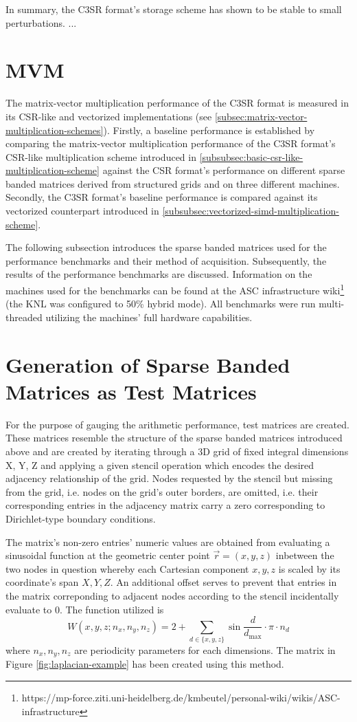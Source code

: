     In summary, the C3SR format's storage scheme has shown to be stable to small perturbations. ...

  \section{MVM}

  The matrix-vector multiplication performance of the C3SR format is measured in its CSR-like and vectorized implementations (see \ref{subsec:matrix-vector-multiplication-schemes}). Firstly, a baseline performance is established by comparing the matrix-vector multiplication performance of the C3SR format's CSR-like multiplication scheme introduced in \ref{subsubsec:basic-csr-like-multiplication-scheme} against the CSR format's performance on different sparse banded matrices derived from structured grids and on three different machines. Secondly, the C3SR format's baseline performance is compared against its vectorized counterpart introduced in \ref{subsubsec:vectorized-simd-multiplication-scheme}.

  The following subsection introduces the sparse banded matrices used for the performance benchmarks and their method of acquisition. Subsequently, the results of the performance benchmarks are discussed. Information on the machines used for the benchmarks can be found at the ASC infrastructure wiki\footnote{https://mp-force.ziti.uni-heidelberg.de/kmbeutel/personal-wiki/wikis/ASC-infrastructure} (the KNL was configured to 50\% hybrid mode). All benchmarks were run multi-threaded utilizing the machines' full hardware capabilities.

  \section{Generation of Sparse Banded Matrices as Test Matrices}

    For the purpose of gauging the arithmetic performance, test matrices are created. These matrices resemble the structure of the sparse banded matrices introduced above and are created by iterating through a 3D grid of fixed integral dimensions X, Y, Z and applying a given stencil operation which encodes the desired adjacency relationship of the grid. Nodes requested by the stencil but missing from the grid, i.e. nodes on the grid's outer borders, are omitted, i.e. their corresponding entries in the adjacency matrix carry a zero corresponding to Dirichlet-type boundary conditions.

    The matrix's non-zero entries' numeric values are obtained from evaluating a sinusoidal function at the geometric center point $\vec{r} = (x, y, z)$ inbetween the two nodes in question whereby each Cartesian component $x, y, z$ is scaled by its coordinate's span $X, Y, Z$. An additional offset serves to prevent that entries in the matrix correponding to adjacent nodes according to the stencil incidentally evaluate to 0. The function utilized is $$W(x,y,z; n_x, n_y, n_z) = 2 + \sum \limits_{d \in \{x,y,z\}} \sin{\frac{d}{d_{\text{max}}} \cdot \pi \cdot n_d} $$ where $n_x, n_y, n_z$ are periodicity parameters for each dimensions. The matrix in Figure \ref{fig:laplacian-example} has been created using this method.

